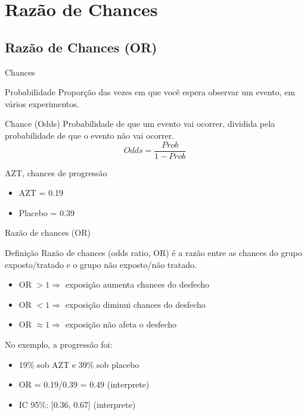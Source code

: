 \documentclass{beamer}
\begin{document}
\section{Razão de Chances}

\subsection{Razão de Chances (OR)}

\begin{frame}{\scriptsize Chances}
  \begin{block}{Probabilidade}
    \footnotesize
    Proporção das vezes em que você espera observar um evento, em vários experimentos.
  \end{block}
  \begin{block}{Chance (Odds)}
    \footnotesize
    Probabilidade de que um evento vai ocorrer, dividida pela probabilidade de que o evento não vai ocorrer.
    \begin{displaymath}
      Odds = \frac{Prob}{1- Prob}
    \end{displaymath}
  \end{block}
  \begin{exampleblock}{AZT, chances de progressão}
    \begin{itemize}
    \item AZT = 0.19
    \item Placebo = 0.39
    \end{itemize}
  \end{exampleblock}
\end{frame}

\begin{frame}{\scriptsize Razão de chances (OR)}
  \begin{block}{Definição}
    \footnotesize
    Razão de chances (odds ratio, OR) é a razão entre as chances do grupo exposto/tratado e o grupo não exposto/não tratado.
  \end{block}
  \begin{itemize}
  \item OR $> 1 \Rightarrow$ exposição aumenta chances do desfecho
  \item OR $< 1 \Rightarrow$ exposição diminui chances do desfecho
  \item OR $\approx 1 \Rightarrow$ exposição não afeta o desfecho
  \end{itemize}
  \begin{exampleblock}{No exemplo, a progressão foi:}
    \begin{itemize}
    \item 19\% sob AZT e 39\% sob placebo
    \item OR = 0.19/0.39 = 0.49 (interprete)
    \item<2-> IC 95\%: [0.36, 0.67] (interprete)
    \end{itemize}
  \end{exampleblock}
\end{frame}
\end{document}
